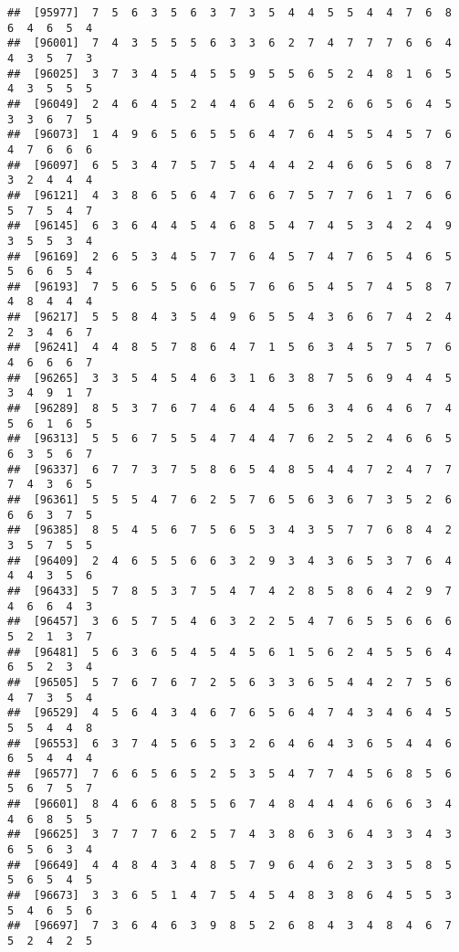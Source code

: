 \documentclass[
]{book}
\begin{document}
\begin{verbatim}
##  [95977]  7  5  6  3  5  6  3  7  3  5  4  4  5  5  4  4  7  6  8  6  4  6  5  4
##  [96001]  7  4  3  5  5  5  6  3  3  6  2  7  4  7  7  7  6  6  4  4  3  5  7  3
##  [96025]  3  7  3  4  5  4  5  5  9  5  5  6  5  2  4  8  1  6  5  4  3  5  5  5
##  [96049]  2  4  6  4  5  2  4  4  6  4  6  5  2  6  6  5  6  4  5  3  3  6  7  5
##  [96073]  1  4  9  6  5  6  5  5  6  4  7  6  4  5  5  4  5  7  6  4  7  6  6  6
##  [96097]  6  5  3  4  7  5  7  5  4  4  4  2  4  6  6  5  6  8  7  3  2  4  4  4
##  [96121]  4  3  8  6  5  6  4  7  6  6  7  5  7  7  6  1  7  6  6  5  7  5  4  7
##  [96145]  6  3  6  4  4  5  4  6  8  5  4  7  4  5  3  4  2  4  9  3  5  5  3  4
##  [96169]  2  6  5  3  4  5  7  7  6  4  5  7  4  7  6  5  4  6  5  5  6  6  5  4
##  [96193]  7  5  6  5  5  6  6  5  7  6  6  5  4  5  7  4  5  8  7  4  8  4  4  4
##  [96217]  5  5  8  4  3  5  4  9  6  5  5  4  3  6  6  7  4  2  4  2  3  4  6  7
##  [96241]  4  4  8  5  7  8  6  4  7  1  5  6  3  4  5  7  5  7  6  4  6  6  6  7
##  [96265]  3  3  5  4  5  4  6  3  1  6  3  8  7  5  6  9  4  4  5  3  4  9  1  7
##  [96289]  8  5  3  7  6  7  4  6  4  4  5  6  3  4  6  4  6  7  4  5  6  1  6  5
##  [96313]  5  5  6  7  5  5  4  7  4  4  7  6  2  5  2  4  6  6  5  6  3  5  6  7
##  [96337]  6  7  7  3  7  5  8  6  5  4  8  5  4  4  7  2  4  7  7  7  4  3  6  5
##  [96361]  5  5  5  4  7  6  2  5  7  6  5  6  3  6  7  3  5  2  6  6  6  3  7  5
##  [96385]  8  5  4  5  6  7  5  6  5  3  4  3  5  7  7  6  8  4  2  3  5  7  5  5
##  [96409]  2  4  6  5  5  6  6  3  2  9  3  4  3  6  5  3  7  6  4  4  4  3  5  6
##  [96433]  5  7  8  5  3  7  5  4  7  4  2  8  5  8  6  4  2  9  7  4  6  6  4  3
##  [96457]  3  6  5  7  5  4  6  3  2  2  5  4  7  6  5  5  6  6  6  5  2  1  3  7
##  [96481]  5  6  3  6  5  4  5  4  5  6  1  5  6  2  4  5  5  6  4  6  5  2  3  4
##  [96505]  5  7  6  7  6  7  2  5  6  3  3  6  5  4  4  2  7  5  6  4  7  3  5  4
##  [96529]  4  5  6  4  3  4  6  7  6  5  6  4  7  4  3  4  6  4  5  5  5  4  4  8
##  [96553]  6  3  7  4  5  6  5  3  2  6  4  6  4  3  6  5  4  4  6  6  5  4  4  4
##  [96577]  7  6  6  5  6  5  2  5  3  5  4  7  7  4  5  6  8  5  6  5  6  7  5  7
##  [96601]  8  4  6  6  8  5  5  6  7  4  8  4  4  4  6  6  6  3  4  4  6  8  5  5
##  [96625]  3  7  7  7  6  2  5  7  4  3  8  6  3  6  4  3  3  4  3  6  5  6  3  4
##  [96649]  4  4  8  4  3  4  8  5  7  9  6  4  6  2  3  3  5  8  5  5  6  5  4  5
##  [96673]  3  3  6  5  1  4  7  5  4  5  4  8  3  8  6  4  5  5  3  5  4  6  5  6
##  [96697]  7  3  6  4  6  3  9  8  5  2  6  8  4  3  4  8  4  6  7  5  2  4  2  5

\end{verbatim}
\end{document}
